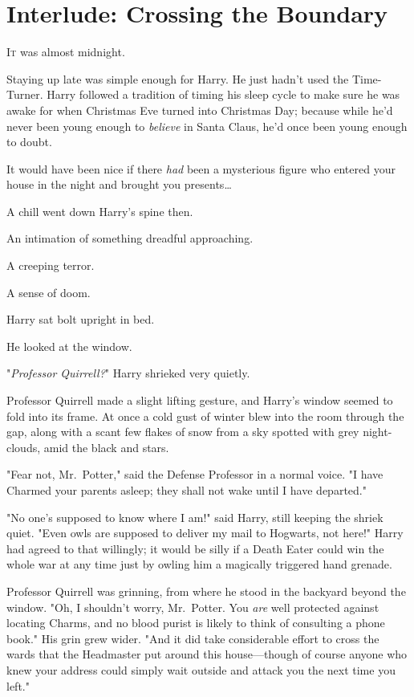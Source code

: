 \chapter{Interlude: Crossing the Boundary}

\lettrine{I}{t} was almost
midnight.

\quad\quad
Staying up late was simple enough for Harry. He just hadn't used the
Time-Turner. Harry followed a tradition of timing his sleep cycle to make sure
he was awake for when Christmas Eve turned into Christmas Day; because while
he'd never been young enough to \emph{believe} in Santa Claus, he'd once been
young enough to doubt.

It would have been nice if there \emph{had} been a mysterious figure who
entered your house in the night and brought you presents{\ldots}

A chill went down Harry's spine then.

An intimation of something dreadful approaching.

A creeping terror.

A sense of doom.

Harry sat bolt upright in bed.

He looked at the window.

"\emph{Professor Quirrell?}" Harry shrieked very quietly.

Professor Quirrell made a slight lifting gesture, and Harry's window seemed to
fold into its frame. At once a cold gust of winter blew into the room through
the gap, along with a scant few flakes of snow from a sky spotted with grey
night-clouds, amid the black and stars.

"Fear not, Mr.~Potter," said the Defense Professor in a normal voice. "I have
Charmed your parents asleep; they shall not wake until I have departed."

"No one's supposed to know where I am!" said Harry, still keeping the shriek
quiet. "Even owls are supposed to deliver my mail to Hogwarts, not here!" Harry
had agreed to that willingly; it would be silly if a Death Eater could win the
whole war at any time just by owling him a magically triggered hand grenade.

Professor Quirrell was grinning, from where he stood in the backyard beyond the
window. "Oh, I shouldn't worry, Mr.~Potter. You \emph{are} well protected
against locating Charms, and no blood purist is likely to think of consulting a
phone book." His grin grew wider. "And it did take considerable effort to cross
the wards that the Headmaster put around this house---though of course anyone
who knew your address could simply wait outside and attack you the next time
you left."

